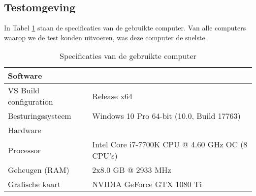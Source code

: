 \subsection{Testomgeving}
In Tabel \ref{tab:pc-specs} staan de specificaties van de gebruikte computer. Van alle computers waarop we de test konden uitvoeren, was deze computer de snelste.

\begin{table}[ht]
    \centering
    \begin{tabular}{|l|l|}
        \hline
        \multicolumn{2}{|l|}{Software} \\
        \hline
        VS Build configuration  & Release x64 \\
        Besturingssysteem       & Windows 10 Pro 64-bit (10.0, Build 17763) \\
        \hline
        \hline
        \multicolumn{2}{|l|}{Hardware} \\
        \hline
        Processor               & Intel Core i7-7700K CPU @ 4.60 GHz OC (8 CPU's) \\
        Geheugen (RAM)          & 2x8.0 GB @ 2933 MHz \\
        Grafische kaart         & NVIDIA GeForce GTX 1080 Ti \\
        \hline
    \end{tabular}
    \caption{Specificaties van de gebruikte computer}
    \label{tab:pc-specs}
\end{table}


